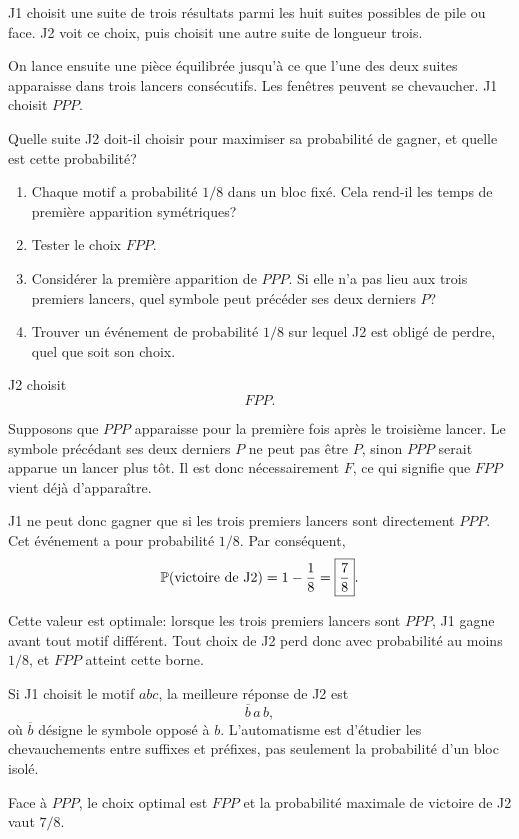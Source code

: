 \documentclass[11pt,a4paper]{article}
\begin{document}

\begin{statementbox}
J1 choisit une suite de trois résultats parmi les huit suites possibles de
pile ou face. J2 voit ce choix, puis choisit une autre suite de longueur trois.

On lance ensuite une pièce équilibrée jusqu'à ce que l'une des deux suites
apparaisse dans trois lancers consécutifs. Les fenêtres peuvent se chevaucher.
J1 choisit $PPP$.

Quelle suite J2 doit-il choisir pour maximiser sa probabilité de gagner, et
quelle est cette probabilité?
\end{statementbox}

\begin{hintsbox}
\begin{enumerate}
  \item Chaque motif a probabilité $1/8$ dans un bloc fixé. Cela rend-il les
  temps de première apparition symétriques?
  \item Tester le choix $FPP$.
  \item Considérer la première apparition de $PPP$. Si elle n'a pas lieu aux
  trois premiers lancers, quel symbole peut précéder ses deux derniers $P$?
  \item Trouver un événement de probabilité $1/8$ sur lequel J2 est obligé de
  perdre, quel que soit son choix.
\end{enumerate}
\end{hintsbox}

\correction

J2 choisit
\[
\boxed{FPP}.
\]

Supposons que $PPP$ apparaisse pour la première fois après le troisième
lancer. Le symbole précédant ses deux derniers $P$ ne peut pas être $P$, sinon
$PPP$ serait apparue un lancer plus tôt. Il est donc nécessairement $F$, ce
qui signifie que $FPP$ vient déjà d'apparaître.

J1 ne peut donc gagner que si les trois premiers lancers sont directement
$PPP$. Cet événement a pour probabilité $1/8$. Par conséquent,
\[
\mathbb P(\text{victoire de J2})=1-\frac18=\boxed{\frac78}.
\]

Cette valeur est optimale: lorsque les trois premiers lancers sont $PPP$, J1
gagne avant tout motif différent. Tout choix de J2 perd donc avec probabilité
au moins $1/8$, et $FPP$ atteint cette borne.

\begin{keyideabox}
Si J1 choisit le motif $abc$, la meilleure réponse de J2 est
\[
\overline b\,a\,b,
\]
où $\overline b$ désigne le symbole opposé à $b$. L'automatisme est d'étudier
les chevauchements entre suffixes et préfixes, pas seulement la probabilité
d'un bloc isolé.
\end{keyideabox}

\begin{resultbox}
Face à $PPP$, le choix optimal est $FPP$ et la probabilité maximale de victoire
de J2 vaut $7/8$.
\end{resultbox}
\end{document}

